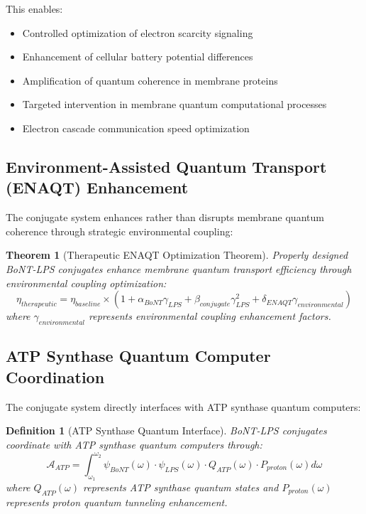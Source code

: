 \documentclass[12pt,a4paper]{article}
\newtheorem{theorem}{Theorem}
\newtheorem{definition}{Definition}
\begin{document}
This enables:
\begin{itemize}
\item Controlled optimization of electron scarcity signaling
\item Enhancement of cellular battery potential differences
\item Amplification of quantum coherence in membrane proteins
\item Targeted intervention in membrane quantum computational processes
\item Electron cascade communication speed optimization
\end{itemize}

\subsection{Environment-Assisted Quantum Transport (ENAQT) Enhancement}

The conjugate system enhances rather than disrupts membrane quantum coherence through strategic environmental coupling:

\begin{theorem}[Therapeutic ENAQT Optimization Theorem]
Properly designed BoNT-LPS conjugates enhance membrane quantum transport efficiency through environmental coupling optimization:
\begin{equation}
\eta_{therapeutic} = \eta_{baseline} \times (1 + \alpha_{BoNT} \gamma_{LPS} + \beta_{conjugate} \gamma_{LPS}^2 + \delta_{ENAQT} \gamma_{environmental})
\end{equation}
where $\gamma_{environmental}$ represents environmental coupling enhancement factors.
\end{theorem}

\subsection{ATP Synthase Quantum Computer Coordination}

The conjugate system directly interfaces with ATP synthase quantum computers:

\begin{definition}[ATP Synthase Quantum Interface]
BoNT-LPS conjugates coordinate with ATP synthase quantum computers through:
\begin{equation}
\mathcal{A}_{ATP} = \int_{\omega_1}^{\omega_2} \psi_{BoNT}(\omega) \cdot \psi_{LPS}(\omega) \cdot Q_{ATP}(\omega) \cdot P_{proton}(\omega) d\omega
\end{equation}
where $Q_{ATP}(\omega)$ represents ATP synthase quantum states and $P_{proton}(\omega)$ represents proton quantum tunneling enhancement.
\end{definition}
\end{document}
